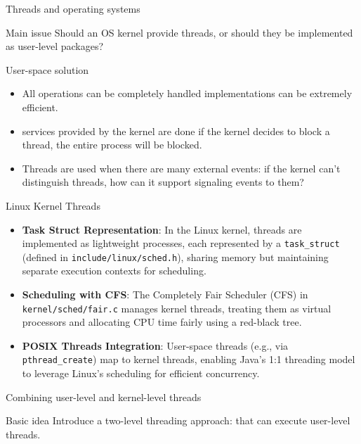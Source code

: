 \begin{slide}{Threads and operating systems}
  \begin{alertblock}{Main issue} 
    Should an OS kernel provide threads, or should they be implemented as user-level packages?
  \end{alertblock}
  \begin{block}{User-space solution}
    \begin{itemize}
    \item All operations can be completely handled  \mathexpr{\Rightarrow}
      implementations can be extremely efficient.
    \item {} services provided by the kernel are done  \mathexpr{\Rightarrow} if the kernel decides to block a thread, the entire process will be
      blocked.
    \item Threads are used when there are many external events: 
      \mathexpr{\Rightarrow} if the kernel can't distinguish threads, how can it support signaling events to
      them?
    \end{itemize}
  \end{block}
\end{slide}
\begin{slide}{Linux Kernel Threads}
\begin{itemize}
  \item \textbf{Task Struct Representation}: In the Linux kernel, threads are implemented as lightweight processes, each represented by a \texttt{task\_struct} (defined in \texttt{include/linux/sched.h}), sharing memory but maintaining separate execution contexts for scheduling.
  \item \textbf{Scheduling with CFS}: The Completely Fair Scheduler (CFS) in \texttt{kernel/sched/fair.c} manages kernel threads, treating them as virtual processors and allocating CPU time fairly using a red-black tree.
  \item \textbf{POSIX Threads Integration}: User-space threads (e.g., via \texttt{pthread\_create}) map to kernel threads, enabling Java’s 1:1 threading model to leverage Linux’s scheduling for efficient concurrency.
\end{itemize}
\end{slide}
  \begin{slide}{Combining user-level and kernel-level threads}
    \begin{block}{Basic idea} 
      Introduce a two-level threading approach:  that can execute user-level
      threads.
    \end{block}
    \begin{block}{}
      \begin{center}
      \end{center}
    \end{block}
  \end{slide}
